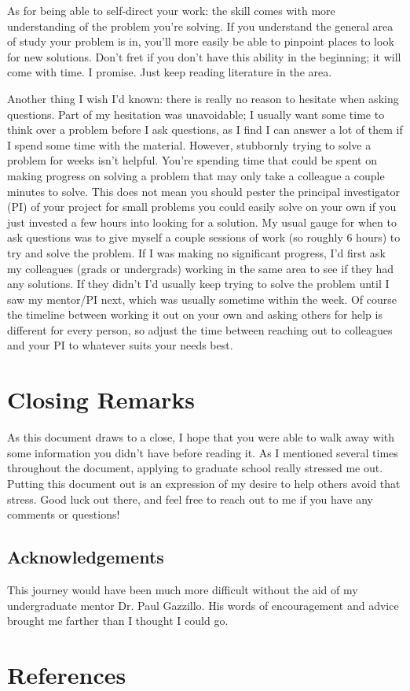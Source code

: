 \documentclass[12pt]{article}
\begin{document}
As for being able to self-direct your work: the skill comes with more understanding of the problem you’re solving. If you understand the general area of study your problem is in, you’ll more easily be able to pinpoint places to look for new solutions. Don’t fret if you don’t have this ability in the beginning; it will come with time. I promise. Just keep reading literature in the area.

Another thing I wish I’d known: there is really no reason to hesitate when asking questions. Part of my hesitation was unavoidable; I usually want some time to think over a problem before I ask questions, as I find I can answer a lot of them if I spend some time with the material. However, stubbornly trying to solve a problem for weeks isn’t helpful. You’re spending time that could be spent on making progress on solving a problem that may only take a colleague a couple minutes to solve. This does not mean you should pester the principal investigator (PI) of your project for small problems you could easily solve on your own if you just invested a few hours into looking for a solution. My usual gauge for when to ask questions was to give myself a couple sessions of work (so roughly 6 hours) to try and solve the problem. If I was making no significant progress, I’d first ask my colleagues (grads or undergrads) working in the same area to see if they had any solutions. If they didn’t I’d usually keep trying to solve the problem until I saw my mentor/PI next, which was usually sometime within the week. Of course the timeline between working it out on your own and asking others for help is different for every person, so adjust the time between reaching out to colleagues and your PI to whatever suits your needs best. 

\section{Closing Remarks}

As this document draws to a close, I hope that you were able to walk away with some information you didn't have before reading it. As I mentioned several times throughout the document, applying to graduate school really stressed me out. Putting this document out is an expression of my desire to help others avoid that stress. Good luck out there, and feel free to reach out to me if you have any comments or questions!

\subsection{Acknowledgements}

This journey would have been much more difficult without the aid of my undergraduate mentor Dr. Paul Gazzillo. His words of encouragement and advice brought me farther than I thought I could go.

\section{References}

\printbibliography[heading=none]
\end{document}
